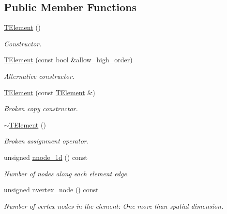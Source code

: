 \subsection*{Public Member Functions}
\begin{DoxyCompactItemize}
\item 
\hyperlink{classoomph_1_1TElement_3_012_00_01NNODE__1D_01_4_a1954e5fad1d12b16e5c0bc64f3c12c97}{T\+Element} ()
\begin{DoxyCompactList}\small\item\em Constructor. \end{DoxyCompactList}\item 
\hyperlink{classoomph_1_1TElement_3_012_00_01NNODE__1D_01_4_ae4a243526a78edfda756af931f9d2f60}{T\+Element} (const bool \&allow\+\_\+high\+\_\+order)
\begin{DoxyCompactList}\small\item\em Alternative constructor. \end{DoxyCompactList}\item 
\hyperlink{classoomph_1_1TElement_3_012_00_01NNODE__1D_01_4_ae3eb1ea12648eff3cc688888ded91a03}{T\+Element} (const \hyperlink{classoomph_1_1TElement}{T\+Element} \&)
\begin{DoxyCompactList}\small\item\em Broken copy constructor. \end{DoxyCompactList}\item 
\hyperlink{classoomph_1_1TElement_3_012_00_01NNODE__1D_01_4_a7ff2fe1600e3d50ad1f597a3d5076443}{$\sim$\+T\+Element} ()
\begin{DoxyCompactList}\small\item\em Broken assignment operator. \end{DoxyCompactList}\item 
unsigned \hyperlink{classoomph_1_1TElement_3_012_00_01NNODE__1D_01_4_accd8f7c31e1d98bb33d186a01c9e5ad6}{nnode\+\_\+1d} () const
\begin{DoxyCompactList}\small\item\em Number of nodes along each element edge. \end{DoxyCompactList}\item 
unsigned \hyperlink{classoomph_1_1TElement_3_012_00_01NNODE__1D_01_4_a0b3bdb736afb3d9d08708f6a34ccf0b3}{nvertex\+\_\+node} () const
\begin{DoxyCompactList}\small\item\em Number of vertex nodes in the element\+: One more than spatial dimension. \end{DoxyCompactList}\item 

\end{DoxyCompactItemize}
